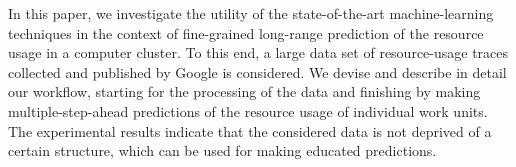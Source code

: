 In this paper, we investigate the utility of the state-of-the-art
machine-learning techniques in the context of fine-grained long-range prediction
of the resource usage in a computer cluster. To this end, a large data set of
resource-usage traces collected and published by Google is considered. We devise
and describe in detail our workflow, starting for the processing of the data and
finishing by making multiple-step-ahead predictions of the resource usage of
individual work units. The experimental results indicate that the considered
data is not deprived of a certain structure, which can be used for making
educated predictions.
